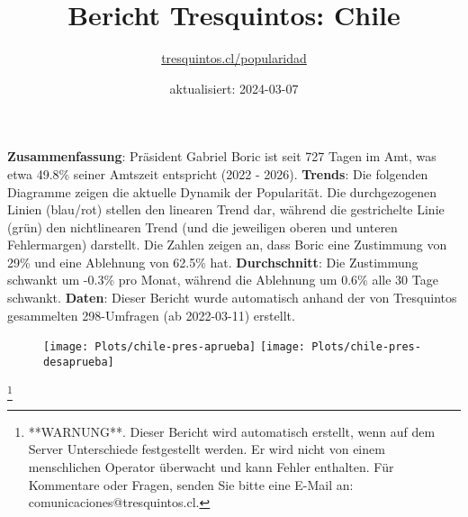 \documentclass[
]{article}
\title{Bericht Tresquintos: Chile}
\subtitle{\href{https://tresquintos.cl}{tresquintos.cl/popularidad}}
\author{}
\date{\vspace{-2.5em}aktualisiert: 2024-03-07}
\begin{document}
\maketitle

\addtolength{\headheight}{1.0cm} 
\pagestyle{fancy} 
\renewcommand{\headrulewidth}{0pt}

\textbf{Zusammenfassung}: Präsident Gabriel Boric ist seit 727 Tagen im
Amt, was etwa 49.8\% seiner Amtszeit entspricht (2022 - 2026).
\textbf{Trends}: Die folgenden Diagramme zeigen die aktuelle Dynamik der
Popularität. Die durchgezogenen Linien (blau/rot) stellen den linearen
Trend dar, während die gestrichelte Linie (grün) den nichtlinearen Trend
(und die jeweiligen oberen und unteren Fehlermargen) darstellt. Die
Zahlen zeigen an, dass Boric eine Zustimmung von 29\% und eine Ablehnung
von 62.5\% hat. \textbf{Durchschnitt}: Die Zustimmung schwankt um -0.3\%
pro Monat, während die Ablehnung um 0.6\% alle 30 Tage schwankt.
\textbf{Daten}: Dieser Bericht wurde automatisch anhand der von
Tresquintos gesammelten 298-Umfragen (ab 2022-03-11) erstellt.

\begin{figure}

{\centering \texttt{[image: Plots/chile-pres-aprueba]} \texttt{[image: Plots/chile-pres-desaprueba]} 

}

\end{figure}

\let\thefootnote\relax

\footnote{**WARNUNG**. Dieser Bericht wird automatisch erstellt, wenn auf dem Server Unterschiede festgestellt werden. Er wird nicht von einem menschlichen Operator überwacht und kann Fehler enthalten. Für Kommentare oder Fragen, senden Sie bitte eine E-Mail an: comunicaciones@tresquintos.cl.}
\end{document}
